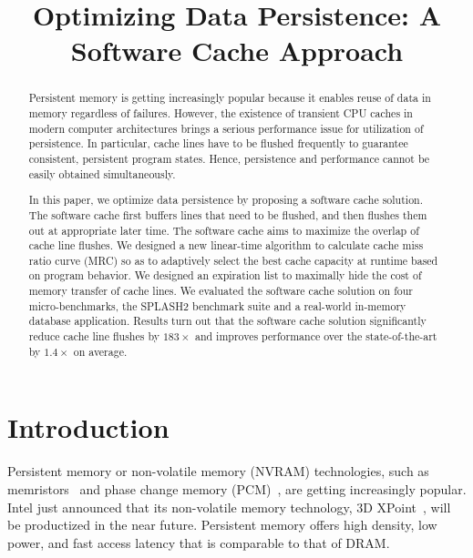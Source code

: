\documentclass[preprint,nocopyrightspace,10pt]{sigplanconf}
\begin{document}
\title{Optimizing Data Persistence: A Software Cache Approach}

\authorinfo{}{}{}


\maketitle

\begin{abstract}

Persistent memory is getting increasingly popular because it enables reuse of data in
memory regardless of failures. However, the existence of transient CPU caches in
modern computer architectures brings a serious performance issue for utilization of
persistence. In particular, cache lines have to be flushed frequently to guarantee
consistent, persistent program states. Hence, persistence and performance cannot
be easily obtained simultaneously.

In this paper, we optimize data persistence by proposing a software cache solution. 
The software cache first buffers lines that need to be flushed, and then flushes them 
out at appropriate later time. The software cache aims to maximize the overlap of cache
line flushes. We designed a new linear-time algorithm to calculate cache miss ratio
curve (MRC) so as to adaptively select the best cache capacity at runtime based on
program behavior. We designed an expiration list to maximally hide the cost of memory
transfer of cache lines. We evaluated the software cache solution on four
micro-benchmarks, the SPLASH2 benchmark suite and a real-world in-memory database
application. Results turn out that the software cache solution significantly reduce
cache line flushes by $183\times$ and improves performance over 
the state-of-the-art by $1.4\times$ on average.

\end{abstract}

\section{Introduction}
\label{sec:intro}

Persistent memory or non-volatile memory (NVRAM) technologies, such as memristors~\cite{Memristor:2008}
and phase change memory (PCM)~\cite{Qureshi:ISCA09,Lee:ISCA09}, are getting increasingly popular. Intel
just announced that its non-volatile memory technology, 3D XPoint~\cite{3DXPoint:2014},
will be productized in the near future. Persistent memory offers high density, low power,
and fast access latency that is comparable to that of DRAM. 
\end{document}
